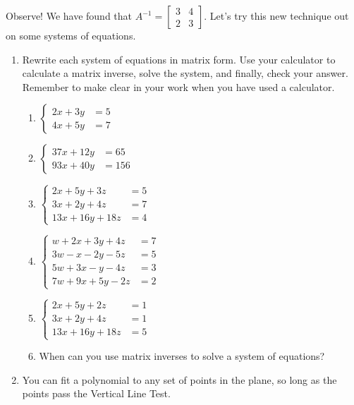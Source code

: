 \documentclass[../gatm.tex]{subfiles}
\begin{document}
\noindent Observe! We have found that $A^{-1}=\left[\begin{smallmatrix}3 & 4 \\ 2 & 3 \end{smallmatrix}\right]$. Let's try this new technique out on some systems of equations.

\begin{enumerate}
\setcounter{enumi}{\value{problem_i}}
\item Rewrite each system of equations in matrix form. Use your calculator to calculate a matrix inverse, solve the system, and finally, check your answer. Remember to make clear in your work when you have used a calculator.
\begin{multicols}{3}
\begin{enumerate}
\item $\begin{cases} 2x+3y &= 5 \\ 4x+5y &= 7 \end{cases}$
\item $\begin{cases} 37x+12y &= 65 \\ 93x+40y &= 156\end{cases}$
\item $\begin{cases} 2x+5y+3z &= 5 \\ 3x+2y+4z &= 7 \\ 13x+16y+18z &= 4\end{cases}$
\item $\begin{cases} w + 2x + 3y + 4z &= 7 \\ 3w-x-2y-5z&=5 \\ 5w+3x-y-4z&=3 \\ 7w+9x+5y-2z&=2\end{cases}$
\item $\begin{cases} 2x+5y+2z &= 1 \\ 3x+2y+4z &= 1 \\ 13x+16y+18z &= 5 \end{cases}$
\item When can you use matrix inverses to solve a system of equations?
\end{enumerate}
\end{multicols}
\item You can fit a polynomial to any set of points in the plane, so long as the points pass the Vertical Line Test.
\begin{enumerate}

\end{enumerate}
\end{enumerate}
\end{document}
